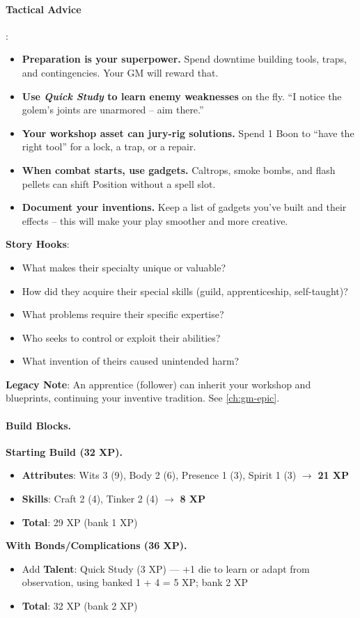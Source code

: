 \paragraph{Tactical Advice}:
\begin{itemize}
\item \textbf{Preparation is your superpower.} Spend downtime building tools, traps, and contingencies. Your GM will reward that.
\item \textbf{Use \emph{Quick Study} to learn enemy weaknesses} on the fly. ``I notice the golem's joints are unarmored -- aim there.''
\item \textbf{Your workshop asset can jury-rig solutions.} Spend 1 Boon to ``have the right tool'' for a lock, a trap, or a repair.
\item \textbf{When combat starts, use gadgets.} Caltrops, smoke bombs, and flash pellets can shift Position without a spell slot.
\item \textbf{Document your inventions.} Keep a list of gadgets you've built and their effects -- this will make your play smoother and more creative.
\end{itemize}

\textbf{Story Hooks}:
\begin{itemize}
\item What makes their specialty unique or valuable?
\item How did they acquire their special skills (guild, apprenticeship, self-taught)?
\item What problems require their specific expertise?
\item Who seeks to control or exploit their abilities?
\item What invention of theirs caused unintended harm?
\end{itemize}

\textbf{Legacy Note}: An apprentice (follower) can inherit your workshop and blueprints, continuing your inventive tradition. See \ref{ch:gm-epic}.

\paragraph{Build Blocks.}
\textbf{Starting Build (32 XP).}
\begin{itemize}
\item \textbf{Attributes}: Wits 3 (9), Body 2 (6), Presence 1 (3), Spirit 1 (3) \(\rightarrow\) \textbf{21 XP}
\item \textbf{Skills}: Craft 2 (4), Tinker 2 (4) \(\rightarrow\) \textbf{8 XP}
\item \textbf{Total}: 29 XP (bank 1 XP)
\end{itemize}
\textbf{With Bonds/Complications (36 XP).}
\begin{itemize}
\item Add \textbf{Talent}: Quick Study (3 XP) --- +1 die to learn or adapt from observation, using banked 1 + 4 = 5 XP; bank 2 XP
\item \textbf{Total}: 32 XP (bank 2 XP)
\end{itemize}

